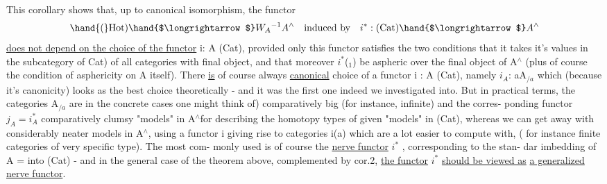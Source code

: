 This corollary shows that, up to canonical isomorphism, the
functor
\[ \hand{(}\mathrm{Hot}) \hand{$\longrightarrow$} W_A{}^{-1}A^\wedge \quad \text{induced by} \quad i^* : (\mathrm{Cat}) \hand{$\longrightarrow$} A^\wedge \]
\uline{does not depend on the choice of the functor} i: A \hand{$\to$}(Cat), provided
only this functor satisfies the two conditions that  it takes it's
values in the  subcategory of \hand{(}Cat) of all categories with final object,
and that moreover $i^*$(\hand{$\Delta$}$_1$) be aspheric over the final object of A$^\wedge$ (plus
of course the condition of asphericity on A itself). There \uline{is} of course
always   \uline{canonical} choice of a functor i : A \hand{$\to$}(Cat), namely $i_A$: a\hand{$\mapsto$}A$_{/a}$\unsure{,}
which (because  it's canonicity) looks as the best choice theoretically -
and it was the first one indeed we investigated into. But in practical
terms, the categories A$_{/a}$ are \hand{(}in  the concrete cases one might
think of) comparatively big  (for instance, infinite) and the corres-%
ponding functor $j_A = i_A^*$  comparatively clumsy "models" in A$^\wedge$\hand{/}for describing
the homotopy types of given "models" in (Cat), whereas we
can get away with considerably neater models in A$^\wedge$, using a functor
i giving rise to categories i(a) which are a lot easier to compute with,
( for instance\hand{,} finite categories of very specific type). The most com-%
monly used is of course the \uline{nerve functor} $i^*$ , corresponding to the stan-%
dar imbedding of A =\hand{$\Delta$} into (Cat) - and in the general case of the
theorem above, complemented by cor.2, \uline{the functor} $i^*$ \uline{should be viewed as}
\uline{a generalized} \uline{nerve functor}.
